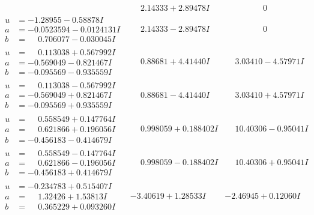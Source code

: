 \documentclass[1p]{elsarticle_modified}
\theoremstyle{definition}
\begin{document}
$$\begin{array}{c|c|c}
 & \phantom{-}2.14333 + 2.89478 I & \phantom{-0.000000 } 0 \\ \hline\begin{aligned}
u &= -1.28955 - 0.58878 I \\
a &= -0.0523594 - 0.0124131 I \\
b &= \phantom{-}0.706077 - 0.030045 I\end{aligned}
 & \phantom{-}2.14333 - 2.89478 I & \phantom{-0.000000 } 0 \\ \hline\begin{aligned}
u &= \phantom{-}0.113038 + 0.567992 I \\
a &= -0.569049 - 0.821467 I \\
b &= -0.095569 - 0.935559 I\end{aligned}
 & \phantom{-}0.88681 + 4.41440 I & \phantom{-}3.03410 - 4.57971 I \\ \hline\begin{aligned}
u &= \phantom{-}0.113038 - 0.567992 I \\
a &= -0.569049 + 0.821467 I \\
b &= -0.095569 + 0.935559 I\end{aligned}
 & \phantom{-}0.88681 - 4.41440 I & \phantom{-}3.03410 + 4.57971 I \\ \hline\begin{aligned}
u &= \phantom{-}0.558549 + 0.147764 I \\
a &= \phantom{-}0.621866 + 0.196056 I \\
b &= -0.456183 - 0.414679 I\end{aligned}
 & \phantom{-}0.998059 + 0.188402 I & \phantom{-}10.40306 - 0.95041 I \\ \hline\begin{aligned}
u &= \phantom{-}0.558549 - 0.147764 I \\
a &= \phantom{-}0.621866 - 0.196056 I \\
b &= -0.456183 + 0.414679 I\end{aligned}
 & \phantom{-}0.998059 - 0.188402 I & \phantom{-}10.40306 + 0.95041 I \\ \hline\begin{aligned}
u &= -0.234783 + 0.515407 I \\
a &= \phantom{-}1.32426 + 1.53813 I \\
b &= \phantom{-}0.365229 + 0.093260 I\end{aligned}
 & -3.40619 + 1.28533 I & -2.46945 + 0.12060 I \\ \hline\begin{aligned}

\end{aligned}
\end{array}$$
\end{document}
